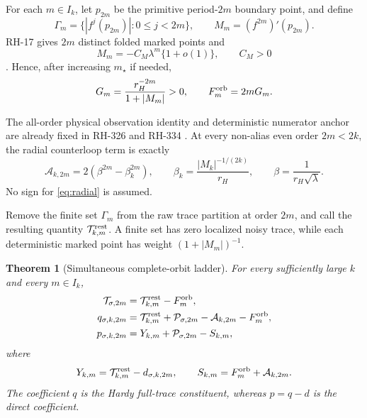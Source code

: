 \documentclass[11pt]{article}
\newtheorem{theorem}{Theorem}[section]
\theoremstyle{remark}
\newcommand{\cP}{\mathcal P}
\newcommand{\cA}{\mathcal A}
\newcommand{\cT}{\mathcal T}
\begin{document}
For each $m\in I_k$, let $p_{2m}$ be the primitive period-$2m$ boundary
point, and define
\begin{equation}\label{eq:orbit}
 \Gamma_m=\{|f^j(p_{2m})|:0\le j<2m\},
 \qquad
 M_m=(f^{2m})'(p_{2m}).
\end{equation}
RH-17 gives $2m$ distinct folded marked points and
\begin{equation}\label{eq:multiplier}
 M_m=-C_M\lambda^m\{1+o(1)\},
 \qquad C_M>0
\end{equation}
\citep{WangBoundaryMonodromy2026}.  Hence, after increasing $m_\star$ if
needed,
\begin{equation}\label{eq:FG}
 G_m=\frac{r_H^{-2m}}{1+|M_m|}>0,
 \qquad F_m^{\rm orb}=2mG_m.
\end{equation}

The all-order physical observation identity and deterministic numerator
anchor are already fixed in RH-326 and RH-334
\citep{WangFirstAlias2026,WangObservation2026}.  At every non-alias even
order $2m<2k$, the radial counterloop term is exactly
\begin{equation}\label{eq:radial}
 \cA_{k,2m}=2(\beta^{2m}-\beta_k^{2m}),
 \qquad
 \beta_k=\frac{|M_k|^{-1/(2k)}}{r_H},
 \qquad
 \beta=\frac1{r_H\sqrt\lambda}.
\end{equation}
No sign for \eqref{eq:radial} is assumed.

Remove the finite set $\Gamma_m$ from the raw trace partition at order
$2m$, and call the resulting quantity $\cT_{k,m}^{\rm rest}$.  A finite set
has zero localized noisy trace, while each deterministic marked point has
weight $(1+|M_m|)^{-1}$.

\begin{theorem}[Simultaneous complete-orbit ladder]\label{thm:ladder}
For every sufficiently large $k$ and every $m\in I_k$,
\begin{align}
 \cT_{\sigma,2m}
 &=\cT_{k,m}^{\rm rest}-F_m^{\rm orb},
 \label{eq:raw}\\
 q_{\sigma,k,2m}
 &=\cT_{k,m}^{\rm rest}+\cP_{\sigma,2m}
   -\cA_{k,2m}-F_m^{\rm orb},
 \label{eq:q}\\
 p_{\sigma,k,2m}
 &=Y_{k,m}+\cP_{\sigma,2m}-S_{k,m},
 \label{eq:p}
\end{align}
where
\begin{equation}\label{eq:YS}
 Y_{k,m}=\cT_{k,m}^{\rm rest}-d_{\sigma,k,2m},
 \qquad
 S_{k,m}=F_m^{\rm orb}+\cA_{k,2m}.
\end{equation}
The coefficient $q$ is the Hardy full-trace constituent, whereas $p=q-d$
is the direct coefficient.
\end{theorem}
\end{document}
